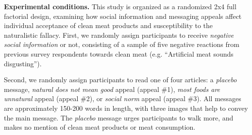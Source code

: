 \documentclass[12pt]{article}
\newcommand{\todo}[1]{\textit{\textcolor{red}{$<$todo$>$ #1 $<$/todo$>$}}}
\begin{document}
\textbf{Experimental conditions.} This study is organized as a randomized 2x4 full factorial design, examining how social information and messaging appeals affect individual acceptance of clean meat products and susceptibility to the naturalistic fallacy. First, we randomly assign participants to receive \textit{negative social information} or not, consisting of a sample of five negative reactions from previous survey respondents towards clean meat (e.g. ``Artificial meat sounds disgusting''). 


Second, we randomly assign participants to read one of four articles: a \textit{placebo} message, \textit{natural does not mean good} appeal (appeal \#1), \textit{most foods are unnatural} appeal (appeal \#2), or \textit{social norm} appeal (appeal \#3). All messages are approximately 150-200 words in length, with three images that help to convey the main message. The \textit{placebo} message urges participants to walk more, and makes no mention of clean meat products or meat consumption.

\end{document}
